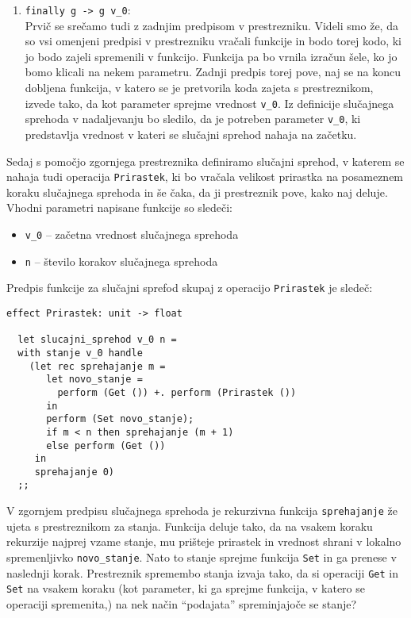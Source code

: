\documentclass[a4paper,12pt]{article}
\theoremstyle{definition} %
\begin{document}
\begin{enumerate}
\item \lstinline{finally g -> g v_0}: \\ Prvič se srečamo tudi z zadnjim predpisom v prestrezniku. Videli smo že, da so vsi omenjeni predpisi v prestrezniku vračali funkcije in bodo torej  kodo, ki jo bodo zajeli spremenili v funkcijo. Funkcija pa bo vrnila izračun šele, ko jo bomo klicali na nekem parametru. Zadnji predpis torej pove, naj se na koncu dobljena funkcija, v katero se je pretvorila koda zajeta s prestreznikom, izvede tako, da kot parameter sprejme vrednost \lstinline{v_0}. Iz definicije slučajnega sprehoda v nadaljevanju bo sledilo, da je potreben parameter \lstinline{v_0}, ki predstavlja vrednost v kateri se slučajni sprehod nahaja na začetku.
\end{enumerate}
Sedaj s pomočjo zgornjega prestreznika definiramo slučajni sprehod, v katerem se nahaja tudi operacija \lstinline{Prirastek}, ki bo vračala velikost prirastka na posameznem koraku slučajnega sprehoda in še čaka, da ji prestreznik pove, kako naj deluje. Vhodni parametri napisane funkcije so sledeči:
\begin{itemize}
\item \lstinline{v_0} -- začetna vrednost slučajnega sprehoda
\item \lstinline{n} -- število korakov slučajnega sprehoda
\end{itemize}
Predpis funkcije za slučajni sprefod skupaj z operacijo \lstinline{Prirastek} je sledeč:
 \begin{lstlisting}
effect Prirastek: unit -> float

  let slucajni_sprehod v_0 n =
  with stanje v_0 handle
    (let rec sprehajanje m =
       let novo_stanje =
         perform (Get ()) +. perform (Prirastek ())
       in
       perform (Set novo_stanje);
       if m < n then sprehajanje (m + 1) 
       else perform (Get ())
     in
     sprehajanje 0)
  ;;
\end{lstlisting}
V zgornjem predpisu slučajnega sprehoda je rekurzivna funkcija \lstinline{sprehajanje} že ujeta s prestreznikom za stanja. Funkcija deluje tako, da na vsakem koraku rekurzije najprej vzame stanje, mu prišteje prirastek in vrednost shrani v lokalno spremenljivko \lstinline{novo_stanje}. Nato to stanje sprejme funkcija \lstinline{Set} in ga prenese v naslednji korak. Prestreznik spremembo stanja izvaja tako, da si operaciji \lstinline{Get} in \lstinline{Set} na vsakem koraku (kot parameter, ki ga sprejme funkcija, v katero se operaciji spremenita,) na nek način "`podajata"' spreminjajoče se stanje? \\
\end{document}
